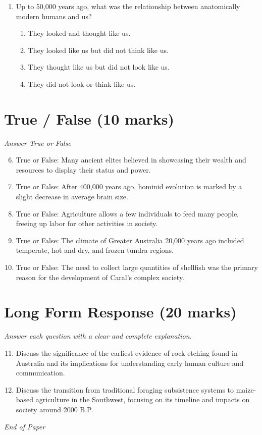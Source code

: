 \documentclass[12pt]{article}
\begin{document}
\begin{enumerate}[label=\arabic*.]
\begin{enumerate}[label=(\alph*)]
    \item abstained from sexual relations
\end{enumerate}
\item Up to 50,000 years ago, what was the relationship between anatomically modern humans and us?
\begin{enumerate}[label=(\alph*)]
    \item They looked and thought like us.
    \item They looked like us but did not think like us.
    \item They thought like us but did not look like us.
    \item They did not look or think like us.
\end{enumerate}
\end{enumerate}

\section*{True / False (10 marks)}
\textit{Answer True or False}
\begin{enumerate}[label=\arabic*.]
\setcounter{enumi}{5}
\item True or False: Many ancient elites believed in showcasing their wealth and resources to display their status and power.
\item True or False: After 400,000 years ago, hominid evolution is marked by a slight decrease in average brain size.
\item True or False: Agriculture allows a few individuals to feed many people, freeing up labor for other activities in society.
\item True or False: The climate of Greater Australia 20,000 years ago included temperate, hot and dry, and frozen tundra regions.
\item True or False: The need to collect large quantities of shellfish was the primary reason for the development of Caral's complex society.
\end{enumerate}

\section*{Long Form Response (20 marks)}
\textit{Answer each question with a clear and complete explanation.}
\begin{enumerate}[label=\arabic*.]
\setcounter{enumi}{10}
\item Discuss the significance of the earliest evidence of rock etching found in Australia and its implications for understanding early human culture and communication.
\item Discuss the transition from traditional foraging subsistence systems to maize-based agriculture in the Southwest, focusing on its timeline and impacts on society around 2000 B.P.
\end{enumerate}

\vfill
\noindent\textit{End of Paper}
\end{document}

